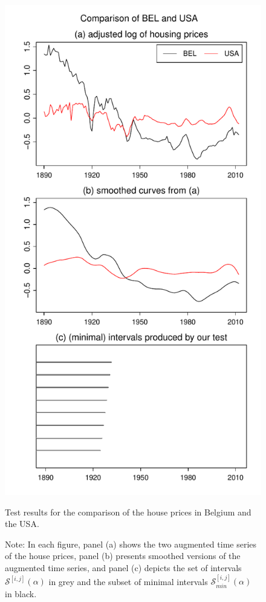 \documentclass[12pt]{article}
\begin{document}
\begin{figure}
\hspace{0.1cm}
\begin{minipage}[t]{0.24\textwidth}
\includegraphics[width=\textwidth]{../output/plots/hp/BEL_vs_USA}
\caption{Test results for the comparison of the house prices in Belgium and the USA.}\label{fig:hp:Belgium:USA}
\end{minipage}
\caption*{Note: In each figure, panel (a) shows the two augmented time series of the house prices, panel (b) presents smoothed versions of the augmented time series, and panel (c) depicts the set of intervals $\mathcal{S}^{[i, j]}(\alpha)$ in grey and the subset of minimal intervals $\mathcal{S}^{[i, j]}_{min}(\alpha)$ in black.}
\end{figure}
\end{document}
